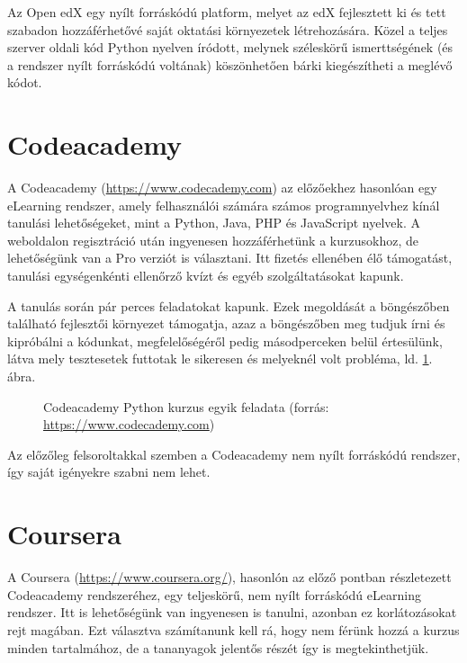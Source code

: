Az Open edX egy nyílt forráskódú platform, melyet az edX fejlesztett ki és tett szabadon hozzáférhetővé saját oktatási környezetek létrehozására. Közel a teljes szerver oldali kód Python nyelven íródott, melynek széleskörű ismerttségének (és a rendszer nyílt forráskódú voltának) köszönhetően bárki kiegészítheti a meglévő kódot.

\section{Codeacademy}

A Codeacademy (\url{https://www.codecademy.com}) az előzőekhez hasonlóan egy eLearning rendszer, amely felhasználói számára számos programnyelvhez kínál tanulási lehetőségeket, mint a Python, Java, PHP és JavaScript nyelvek. A weboldalon regisztráció után ingyenesen hozzáférhetünk a kurzusokhoz, de lehetőségünk van a Pro verziót is választani. Itt fizetés ellenében élő támogatást, tanulási egységenkénti ellenőrző kvízt és egyéb szolgáltatásokat kapunk. \cite{CodeacademyPro}

A tanulás során pár perces feladatokat kapunk. Ezek megoldását a böngészőben található fejlesztői környezet támogatja, azaz a böngészőben meg tudjuk írni és kipróbálni a kódunkat, megfelelőségéről pedig másodperceken belül értesülünk, látva mely tesztesetek futtotak le sikeresen és melyeknél volt probléma, ld. \ref{fig:codeacademy}. ábra.

\begin{figure}[h]
    \centering
    \caption[Codeacademy Python kurzus egyik feladata]{Codeacademy Python kurzus egyik feladata (forrás: \url{https://www.codecademy.com})}
    \label{fig:codeacademy}
\end{figure}

Az előzőleg felsoroltakkal szemben a Codeacademy nem nyílt forráskódú rendszer, így saját igényekre szabni nem lehet.

\section{Coursera}

A Coursera (\url{https://www.coursera.org/}), hasonlón az előző pontban részletezett Codeacademy rendszeréhez, egy teljeskörű, nem nyílt forráskódú eLearning rendszer. Itt is lehetőségünk van ingyenesen is tanulni, azonban ez korlátozásokat rejt magában. Ezt választva számítanunk kell rá, hogy nem férünk hozzá a kurzus minden tartalmához, de a tananyagok jelentős részét így is megtekinthetjük.

